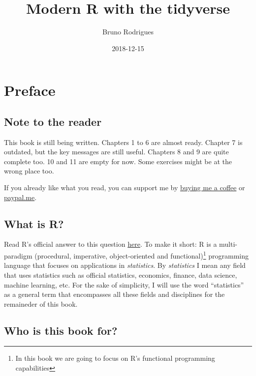 \documentclass[]{gitbook}
\title{Modern R with the tidyverse}
\author{Bruno Rodrigues}
\date{2018-12-15}
\let\rmarkdownfootnote\footnote%
\def\footnote{\protect\rmarkdownfootnote}
\theoremstyle{definition}
\theoremstyle{definition}
\theoremstyle{definition}
\theoremstyle{remark}
\begin{document}
\maketitle

{
\setcounter{tocdepth}{2}
\tableofcontents
}
\hypertarget{preface}{%
\section*{Preface}\label{preface}}

\hypertarget{note-to-the-reader}{%
\subsection*{Note to the reader}\label{note-to-the-reader}}

This book is still being written. Chapters 1 to 6 are almost ready.
Chapter 7 is outdated, but the key messages are still useful. Chapters 8
and 9 are quite complete too. 10 and 11 are empty for now. Some
exercises might be at the wrong place too.

If you already like what you read, you can support me by
\href{https://www.buymeacoffee.com/brodriguesco}{buying me a coffee} or
\href{https://www.paypal.me/brodriguesco}{paypal.me}.

\hypertarget{what-is-r}{%
\subsection*{What is R?}\label{what-is-r}}

Read R's official answer to this question
\href{https://cran.r-project.org/doc/FAQ/R-FAQ.html\#What-is-R_003f}{here}.
To make it short: R is a multi-paradigm (procedural, imperative,
object-oriented and functional)\footnote{In this book we are going to
  focus on R's functional programming capabilities} programming language
that focuses on applications in \emph{statistics}. By \emph{statistics}
I mean any field that uses statistics such as official statistics,
economics, finance, data science, machine learning, etc. For the sake of
simplicity, I will use the word ``statistics'' as a general term that
encompasses all these fields and disciplines for the remaineder of this
book.

\hypertarget{who-is-this-book-for}{%
\subsection*{Who is this book for?}\label{who-is-this-book-for}}
\end{document}
